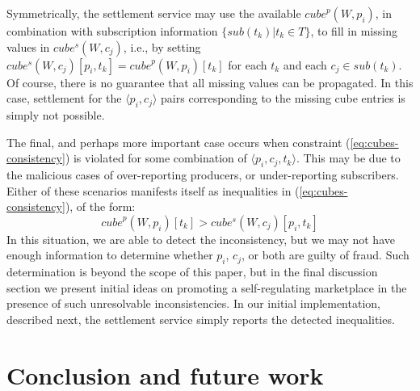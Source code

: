 \documentclass[chi_draft]{sigchi}
\begin{document}
{Symmetrically, the settlement service may use the available $ \mathit{cube}^p(W, p_i)$, in combination with subscription information $ \{\mathit{sub}(t_k) | t_k \in T \}$, to fill in missing values in 
$  \mathit{cube^s}(W, c_j)  $, i.e., by setting 
$ \mathit{cube^s}(W, c_j)[p_i, t_k]  =  \mathit{cube}^p(W, p_i)[t_k]$ for each $t_k$ and each $c_j \in \mathit{sub}(t_k)$.
%
Of course, there is no guarantee that all missing values can be propagated. 
In this case, settlement for the $\langle p_i, c_j \rangle$ pairs corresponding to the missing cube entries is simply not possible.

The final, and perhaps more important case occurs when constraint (\ref{eq:cubes-consistency}) is violated for some combination of $\langle p_i, c_j, t_k \rangle$.
This may be due to the malicious cases of over-reporting producers, or under-reporting subscribers.
%
Either of these  scenarios manifests itself as inequalities in (\ref{eq:cubes-consistency}), of the form:
\begin{equation}\label{eq:inconsistencies}
\mathit{cube}^p(W, p_i)[t_k] > \mathit{cube^s}(W, c_j)[p_i, t_k]
\end{equation}
In this situation, we are able to detect the inconsistency, but we may not have enough information to determine whether $p_i$, $c_j$, or both are guilty of fraud.
Such determination is beyond the scope of this paper, but in the final discussion section we present initial ideas on promoting a self-regulating marketplace in the presence of such unresolvable inconsistencies.
%
In our initial implementation, described next, the settlement service simply reports the detected inequalities.



\section{Conclusion and future work}














}
\end{document}
